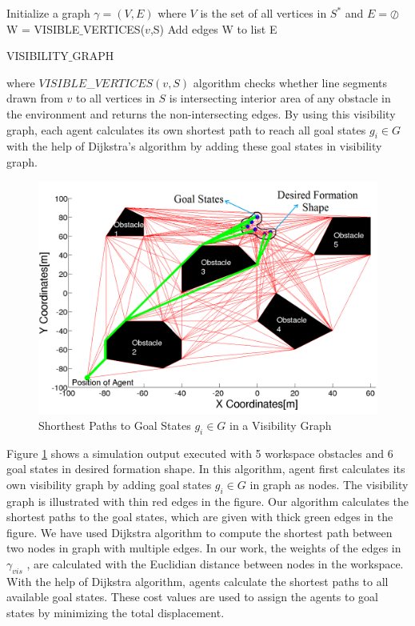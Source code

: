 \documentclass[letterpaper, 10 pt, conference]{ieeeconf}  %
\begin{document}
\begin{algorithm}
Initialize a graph $\gamma = (V,E)$ where $V$ is the set of all vertices in $S^*$ and $E = \oslash$  \\

{	
W = VISIBLE$\_$VERTICES($v$,S)\;
Add edges W to list E\;
}\

\caption{VISIBILITY$\_$GRAPH}

\end{algorithm}

where $VISIBLE$\_$VERTICES(v,S)$ algorithm checks whether line segments drawn from $v$ to all vertices in $S$ is intersecting interior area of any obstacle in the environment and returns the non-intersecting edges.  By using this visibility graph, each agent calculates its own shortest path to reach all goal states $g_i \in G$ with the help of Dijkstra's algorithm by adding these goal states in visibility graph.
	
 
\begin{figure}[thpb]
\centering
\includegraphics[scale = 0.22]{visgraph_yedek}
\caption{Shorthest Paths to Goal States $g_i \in G$ in a Visibility Graph} \label{dijksttae_visibility}
\end{figure}

Figure \ref{dijksttae_visibility} shows a simulation output executed with 5 workspace obstacles and 6 goal states in desired formation shape. In this algorithm, agent first calculates its own visibility graph by adding goal states $g_i \in G$ in graph as nodes. The visibility graph is illustrated with thin red edges in the figure. Our algorithm calculates the shortest paths to the goal states, which are given with thick green edges in the figure. We have used Dijkstra algorithm to compute the shortest path between two nodes in graph with multiple edges. In our work, the weights of the edges in $\gamma_{vis}$ , are calculated with the Euclidian distance between nodes in the workspace. With the help of Dijkstra algorithm, agents calculate the shortest paths to all available goal states. These cost values are used to assign the agents to goal states by minimizing the total displacement.  
\end{document}
